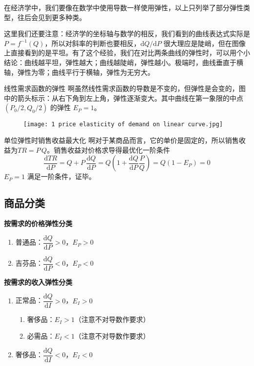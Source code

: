 在经济学中，我们要像在数学中使用导数一样使用弹性，以上只列举了部分弹性类型，往后会见到更多种类。

这里我们还要注意：经济学的坐标轴与数学的相反，我们看到的曲线表达式实际是 $P=f^{-1}\left(Q\right)$，所以对斜率的判断也要相反，$\mathrm dQ/\mathrm dP$ 很大理应是陡峭，但在图像上直接看到的是平坦。有了这个经验，我们在对比两条曲线的弹性时，可以用个小结论：曲线越平坦，弹性越大；曲线越陡峭，弹性越小。极端时，曲线垂直于横轴，弹性为零；曲线平行于横轴，弹性为无穷大。

\begin{tuxiang}[breakable]{线性需求函数的弹性}
    啊虽然线性需求函数的导数是不变的，但弹性是会变的，图中的箭头标示：从右下角到左上角，弹性逐渐变大。其中曲线在第一象限的中点 $\left(P_0/2,Q_0/2\right)$ 的弹性 $E_P=1$。
\end{tuxiang}
\begin{figure}[H]
    \centering
    \texttt{[image: 1 price elasticity of demand on linear curve.jpg]}
\end{figure}

\begin{shuxue}[breakable]{单位弹性时销售收益最大化}
    啊对于某商品而言，它的单价是固定的，所以销售收益为$TR=P\,Q$。销售收益对价格求导得最优化一阶条件
    $$\frac{\mathrm{d}TR}{\mathrm{d}P}=Q+P\,\frac{\mathrm{d}Q}{\mathrm{d}P}=Q\left( 1+\frac{\mathrm{d}Q}{\mathrm{d}P}\frac{P}{Q} \right) =Q\left( 1-E_P \right)=0$$
    $E_P=1$ 满足一阶条件，证毕。
\end{shuxue}

\subsection{商品分类}

\noindent\textbf{按需求的价格弹性分类}
\begin{enumerate}
    \item 普通品：$\dfrac{\mathrm dQ}{\mathrm dP}>0$，$E_P>0$
    \item 吉芬品：$\dfrac{\mathrm dQ}{\mathrm dP}<0$，$E_P<0$
\end{enumerate}
\vspace{1em}

\noindent\textbf{按需求的收入弹性分类}
\begin{enumerate}
    \item 正常品：$\dfrac{\mathrm dQ}{\mathrm dI}>0$，$E_I>0$
    \begin{enumerate}
        \item 奢侈品：$E_I>1$（注意不对导数作要求）
        \item 必需品：$E_I<1$（注意不对导数作要求）
    \end{enumerate}
    \item 奢侈品：$\dfrac{\mathrm dQ}{\mathrm dI}<0$，$E_I<0$
\end{enumerate}
\vspace{1em}

